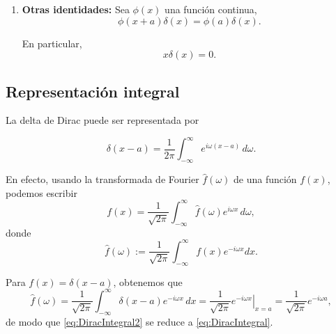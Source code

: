 \begin{enumerate}
    \item \textbf{Otras identidades:} Sea $\phi(x)$ una función continua,
    \begin{equation}
        \phi(x+a)\delta(x) = \phi(a) \delta(x).
    \end{equation}

    En particular,
    \begin{equation}
        x\delta(x) = 0.
    \end{equation}
\end{enumerate}

\subsection*{Representación integral}

La delta de Dirac puede ser representada por
\begin{shaded}
\begin{equation}
\delta(x-a) = \frac{1}{2\pi} \int_{-\infty}^{\infty} e^{i\omega(x-a)} \,d\omega.  \label{eq:DiracIntegral}
\end{equation}    
\end{shaded}

En efecto, usando la transformada de Fourier $\hat{f}(\omega)$ de una función $f(x)$, podemos escribir 
\begin{equation}
 f(x) = \frac{1}{\sqrt{2\pi}}  \int_{-\infty}^{\infty} \hat{f}(\omega) e^{i\omega x} \,d\omega, \label{eq:DiracIntegral2}
\end{equation}
donde 
\begin{equation}
\hat{f}(\omega) := \frac{1}{\sqrt{2\pi}} \int_{-\infty}^{\infty} f(x) e^{-i\omega x}  dx.    
\end{equation}

Para $f(x) = \delta(x-a)$, obtenemos que 
\begin{equation}
 \hat{f}(\omega) = \frac{1}{\sqrt{2\pi}} \int_{-\infty}^{\infty} \delta(x-a) e^{-i\omega x}  \,dx = \frac{1}{\sqrt{2\pi}} \left. e^{-i\omega x}\right|_{x=a} = \frac{1}{\sqrt{2\pi}} e^{-i\omega a},   
\end{equation}
de modo que \eqref{eq:DiracIntegral2} se reduce a \eqref{eq:DiracIntegral}.

